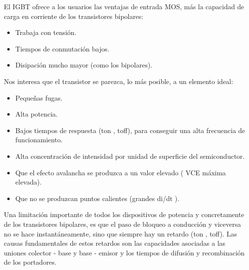 \documentclass[12pt]{article}
\begin{document}


\vspace{\baselineskip}
El IGBT ofrece a los usuarios las ventajas de entrada MOS, más la capacidad de carga en corriente de los transistores bipolares: \par

\begin{itemize}
	\item Trabaja con tensión. \par

	\item Tiempos de conmutación bajos. \par

	\item Disipación mucho mayor (como los bipolares). 
\end{itemize}\par

Nos interesa que el transistor se parezca, lo más posible, a un elemento ideal: \par

\begin{itemize}
	\item Pequeñas fugas. \par

	\item Alta potencia. \par

	\item Bajos tiempos de respuesta (ton , toff), para conseguir una alta frecuencia de funcionamiento. \par

	\item Alta concentración de intensidad por unidad de superficie del semiconductor. \par

	\item Que el efecto avalancha se produzca a un valor elevado ( VCE máxima elevada). \par

	\item Que no se produzcan puntos calientes (grandes di/dt ). 
\end{itemize}\par

Una limitación importante de todos los dispositivos de potencia y concretamente de los transistores bipolares, es que el paso de bloqueo a conducción y viceversa no se hace instantáneamente, sino que siempre hay un retardo (ton , toff). Las causas fundamentales de estos retardos son las capacidades asociadas a las uniones colector - base y base - emisor y los tiempos de difusión y recombinación de los portadores. \par
\end{document}
